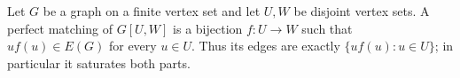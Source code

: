 \begin{definition}
Let $G$ be a graph on a finite vertex set and let $U,W$ be disjoint vertex sets.  A perfect matching of $G[U,W]$ is a bijection $f:U\to W$ such that $u f(u)\in E(G)$ for every $u\in U$.  Thus its edges are exactly $\{u f(u):u\in U\}$; in particular it saturates both parts.
\end{definition}
